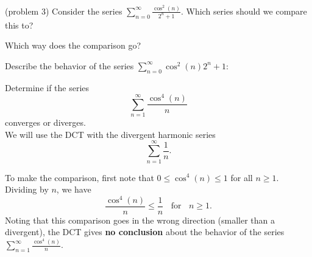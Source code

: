 \documentclass{ximera}
\begin{document}
\begin{problem}(problem 3)
Consider the series $\sum_{n=0}^\infty \frac{\cos^2(n)}{2^n + 1}$.
Which series should we compare this to?

\begin{multipleChoice}
\end{multipleChoice}

Which way does the comparison go?
\begin{multipleChoice}
\end{multipleChoice}

Describe the behavior of the series $\sum_{n=0}^\infty {\cos^2(n)}{2^n + 1}:$
\begin{multipleChoice}
\end{multipleChoice}

\end{problem}




\begin{example}[example 4] %
Determine if the series 
\[
\sum_{n=1}^\infty \frac{\cos^4(n)}{n}
\]
 converges or diverges.\\
We will use the DCT with the divergent harmonic series 
\[
\sum_{n=1}^\infty \frac{1}{n}.
\]
 
To make the comparison, first note that $0 \leq \cos^4(n) \leq 1$ for all $n \geq 1$. Dividing by $n$,
we have 
\[
\frac{\cos^4(n)}{n} \leq \frac{1}{n} \; \; \text{ for } \; \; n \geq 1.
\]
Noting that this comparison goes in the wrong direction (smaller than a divergent), the DCT gives \textbf{no conclusion}
about the behavior of the series $\sum_{n=1}^\infty \frac{\cos^4(n)}{n}$.
\end{example}
\end{document}
